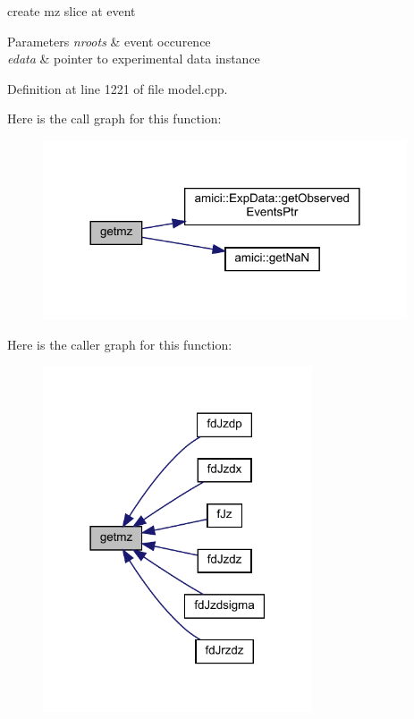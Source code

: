 create mz slice at event 
\begin{DoxyParams}{Parameters}
{\em nroots} & event occurence \\
\hline
{\em edata} & pointer to experimental data instance \\
\hline
\end{DoxyParams}


Definition at line 1221 of file model.\+cpp.

Here is the call graph for this function\+:
\nopagebreak
\begin{figure}[H]
\begin{center}
\leavevmode
\includegraphics[width=305pt]{classamici_1_1_model_a523a7d80e06bfab324d566dd6032abcf_cgraph}
\end{center}
\end{figure}
Here is the caller graph for this function\+:
\nopagebreak
\begin{figure}[H]
\begin{center}
\leavevmode
\includegraphics[width=226pt]{classamici_1_1_model_a523a7d80e06bfab324d566dd6032abcf_icgraph}
\end{center}
\end{figure}
\mbox{\label{classamici_1_1_model_aee6c7b534a091180c01aabb3be44a216}} 
